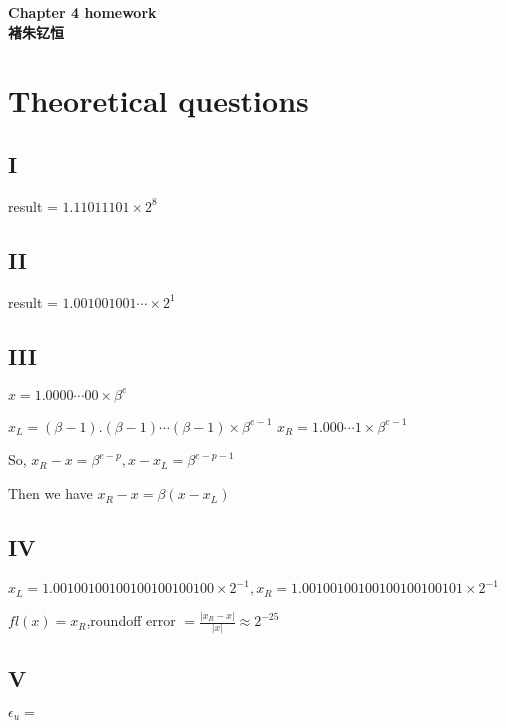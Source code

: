 \documentclass[12]{article}%
\begin{document}
\begin{center}
    \LARGE\songti\textbf{Chapter 4 homework} \\%
    \large\kaishu\textbf{褚朱钇恒}%
\end{center}
    \section{Theoretical questions}
        \subsection{I}
        result = $1.11011101\times2^8$

        \subsection{II}
        result = $1.001001001\cdots\times2^1$

        \subsection{III}
        $x=1.0000\cdots00\times \beta^e$

        $x_L=(\beta-1).(\beta-1)\cdots(\beta-1)\times \beta^{e-1}$
        $x_R=1.000\cdots1\times \beta^{e-1}$

        So, $x_R-x=\beta^{e-p},x-x_L=\beta^{e-p-1}$

        Then we have $x_R-x=\beta(x-x_L)$
        
        \subsection{IV}
        $x_L=1.00100100100100100100100\times2^{-1},x_R=1.00100100100100100100101\times 2^{-1}$

        $fl(x)=x_R$,roundoff error $=\frac{|x_R-x|}{|x|}\approx2^{-25}$
        
        \subsection{V}
        $\epsilon_u=$
\end{document}
